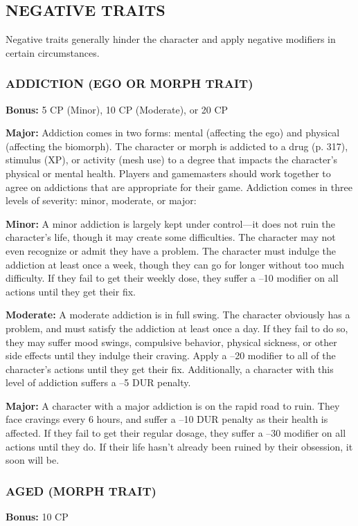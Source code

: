 \subsection{NEGATIVE TRAITS}

Negative traits generally hinder the character and
apply negative modifiers in certain circumstances.

\subsubsection{ADDICTION (EGO OR MORPH TRAIT)}
\textbf{Bonus:} 5 CP (Minor), 10 CP (Moderate), or 20 CP

\textbf{Major:} Addiction comes in two forms: mental (affecting
the ego) and physical (affecting the biomorph). The
character or morph is addicted to a drug (p. 317),
stimulus (XP), or activity (mesh use) to a degree that
impacts the character’s physical or mental health.
Players and gamemasters should work together to
agree on addictions that are appropriate for their
game. Addiction comes in three levels of severity:
minor, moderate, or major:

\textbf{Minor:} A minor addiction is largely kept under
control—it does not ruin the character’s life, though
it may create some difficulties. The character may not
even recognize or admit they have a problem. The
character must indulge the addiction at least once
a week, though they can go for longer without too
much difficulty. If they fail to get their weekly dose,
they suffer a –10 modifier on all actions until they get
their fix.

\textbf{Moderate:} A moderate addiction is in full swing.
The character obviously has a problem, and must
satisfy the addiction at least once a day. If they fail
to do so, they may suffer mood swings, compulsive
behavior, physical sickness, or other side effects until
they indulge their craving. Apply a –20 modifier to
all of the character’s actions until they get their fix.
Additionally, a character with this level of addiction
suffers a –5 DUR penalty.

\textbf{Major:} A character with a major addiction is on
the rapid road to ruin. They face cravings every 6
hours, and suffer a –10 DUR penalty as their health
is affected. If they fail to get their regular dosage, they
suffer a –30 modifier on all actions until they do. If
their life hasn’t already been ruined by their obsession,
it soon will be.

\subsubsection{AGED (MORPH TRAIT)}
\textbf{Bonus:} 10 CP

